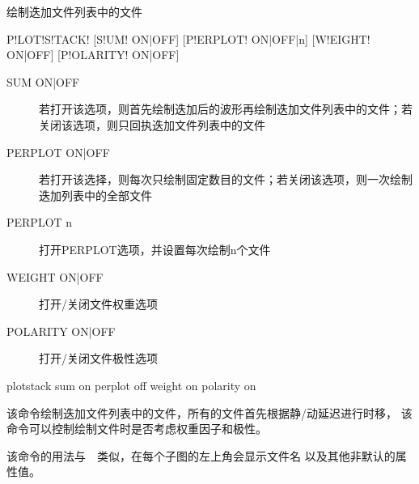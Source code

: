 \label{sss:plotstack}

绘制迭加文件列表中的文件

\begin{SACSTX}
P!LOT!S!TACK! [S!UM! ON|OFF] [P!ERPLOT! ON|OFF|n] [W!EIGHT! ON|OFF]
    [P!OLARITY! ON|OFF]
\end{SACSTX}

\begin{description}
\item [SUM ON|OFF] 若打开该选项，则首先绘制迭加后的波形再绘制迭加文件列表中的文件；若关闭该选项，则只回执迭加文件列表中的文件
\item [PERPLOT ON|OFF] 若打开该选择，则每次只绘制固定数目的文件；若关闭该选项，则一次绘制迭加列表中的全部文件
\item [PERPLOT n] 打开PERPLOT选项，并设置每次绘制n个文件
\item [WEIGHT ON|OFF] 打开/关闭文件权重选项
\item [POLARITY ON|OFF] 打开/关闭文件极性选项
\end{description}

\begin{SACDFT}
plotstack sum on perplot off weight on polarity on
\end{SACDFT}

该命令绘制迭加文件列表中的文件，所有的文件首先根据静/动延迟进行时移，
该命令可以控制绘制文件时是否考虑权重因子和极性。

该命令的用法与~~类似，在每个子图的左上角会显示文件名
以及其他非默认的属性值。

